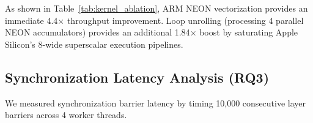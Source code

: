 \documentclass[10pt,twocolumn]{article}
\begin{document}
\begin{table}[htbp]
\caption{Kernel Optimization Ablation on Apple M2 CPU}
\label{tab:kernel_ablation}
\centering
{}
\end{table}

As shown in Table~\ref{tab:kernel_ablation}, ARM NEON vectorization provides an immediate 4.4$\times$ throughput improvement. Loop unrolling (processing 4 parallel NEON accumulators) provides an additional 1.84$\times$ boost by saturating Apple Silicon's 8-wide superscalar execution pipelines.

\subsection{Synchronization Latency Analysis (RQ3)}
We measured synchronization barrier latency by timing 10,000 consecutive layer barriers across 4 worker threads.

\begin{table}[htbp]
\caption{Synchronization Barrier Latency ($\mu$s, $n=10,000$ iterations)}
\label{tab:sync_latency}
\centering
{}
\end{table}
\end{document}
